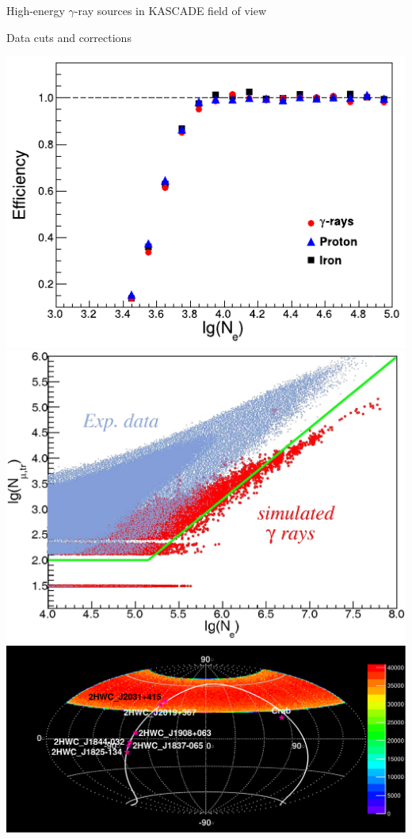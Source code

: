 \begin{frame}{High-energy $\gamma$-ray sources in KASCADE field of view}
\begin{minipage}[c]{0.25\textwidth}
\end{minipage}
\end{frame}

\begin{frame}{Data cuts and corrections}
\begin{center}
  \includegraphics[height=0.39\textheight]{pics/eff_Ne_Donghwa.pdf}\hspace{1em}
  \includegraphics[height=0.39\textheight]{pics/gamma_cut.png}\\
  \includegraphics[height=0.42\textheight]{pics/Skymap_6srcs_exp.pdf}
\end{center}
\end{frame}

